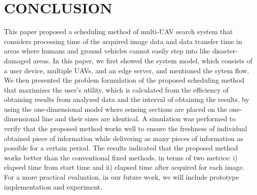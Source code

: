 \documentclass{ieeeaccess}
\begin{document}
\section{CONCLUSION}
This paper proposed a scheduling method of multi-UAV search system that considers processing time of the acquired image data and data transfer time in areas where humans and ground vehicles cannot easily step into like disaster-damaged areas.
In this paper, we first showed the system model, which consists of a user device, multiple UAVs, and an edge server, and mentioned the sytem flow. 
We then presented the problem formulation of the proposed scheduling method that maximizes the user’s utility, which is calculated from the efficiency of obtaining results from analyzed data and the interval of obtaining the results, by using the one-dimensional model where sensing sections are placed on the one-dimensional line and their sizes are identical.
A simulation was performed to verify that the proposed method works well to ensure the freshness of individual obtained piece of information while delivering as many pieces of information as possible for a certain period.
The results indicated that the proposed method works better than the conventional fixed methods, in terms of two metrics: i) elapsed time from start time and ii) elapsed time after acquired for each image.
For a more practical evaluation, in our future work, we will include prototype implementation and experiment.



%
\end{document}
